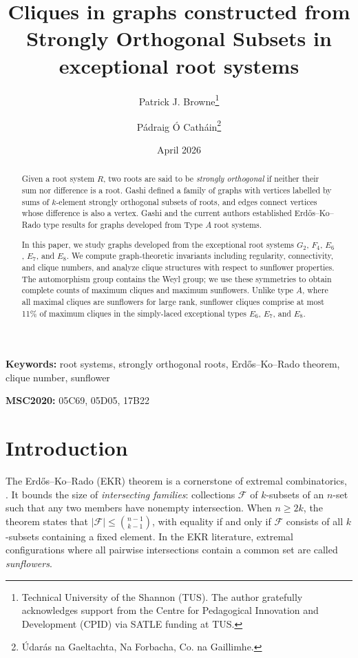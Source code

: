 \documentclass[11pt]{article}
\title{Cliques in graphs constructed from Strongly Orthogonal Subsets in exceptional root systems}
\author{Patrick J. Browne\footnote{Technical University of the Shannon (TUS). The author gratefully acknowledges support from the Centre for Pedagogical Innovation and Development (CPID) via SATLE funding at TUS.} \and Pádraig Ó Catháin\footnote{Údarás na Gaeltachta, Na Forbacha, Co. na Gaillimhe.}}
\date{April 2026}
\begin{document}
\maketitle

\begin{abstract}
Given a root system $R$, two roots are said to be \emph{strongly orthogonal} if neither their sum nor difference is a root. Gashi defined a family of graphs with vertices labelled by sums of $k$-element strongly orthogonal subsets of roots, and edges connect vertices whose difference is also a vertex. Gashi and the current authors established Erd\H{o}s--Ko--Rado type results for graphs developed from Type $A$ root systems. 

In this paper, we study graphs developed from the exceptional root systems $G_2$, $F_4$, $E_6$, $E_7$, and $E_8$. We compute graph-theoretic invariants including regularity, connectivity, and clique numbers, and analyze clique structures with respect to sunflower properties. The automorphism group contains the Weyl group; we use these symmetries to obtain complete counts of maximum cliques and maximum sunflowers. Unlike type $A$, where all maximal cliques are sunflowers for large rank, sunflower cliques comprise at most 11\% of maximum cliques in the simply-laced exceptional types $E_6$, $E_7$, and $E_8$.
\end{abstract}

\noindent\textbf{Keywords:} root systems, strongly orthogonal roots, Erd\H{o}s--Ko--Rado theorem, clique number, sunflower

\noindent\textbf{MSC2020:} 05C69, 05D05, 17B22

\section{Introduction}

The Erd\H{o}s--Ko--Rado (EKR) theorem is a cornerstone of extremal combinatorics, \cite{EKR}. It bounds the size of \emph{intersecting families}: collections $\mathcal{F}$ of $k$-subsets of an $n$-set such that any two members have nonempty intersection. When $n \geq 2k$, the theorem states that $|\mathcal{F}| \leq \binom{n-1}{k-1}$, with equality if and only if $\mathcal{F}$ consists of all $k$-subsets containing a fixed element. In the EKR literature, extremal configurations where all pairwise intersections contain a common set are called \emph{sunflowers}. 
\end{document}
